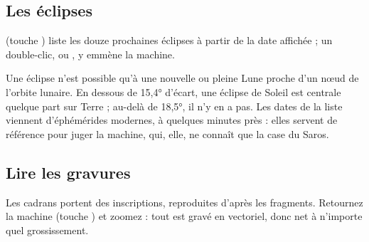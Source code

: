 \subsection{Les éclipses}

 (touche ) liste les douze prochaines éclipses
à partir de la date affichée ; un double-clic, ou , y emmène la
machine.


\begin{info}
Une éclipse n'est possible qu'à une nouvelle ou pleine Lune proche d'un n\oe ud de l'orbite
lunaire. En dessous de 15,4° d'écart, une éclipse de Soleil est centrale quelque part sur
Terre ; au-delà de 18,5°, il n'y en a pas. Les dates de la liste viennent d'éphémérides
modernes, à quelques minutes près : elles servent de référence pour juger la machine, qui, elle,
ne connaît que la case du Saros.
\end{info}

\subsection{Lire les gravures}

Les cadrans portent des inscriptions, reproduites d'après les fragments. Retournez la machine
(touche ) et zoomez : tout est gravé en vectoriel, donc net à n'importe quel
grossissement.


